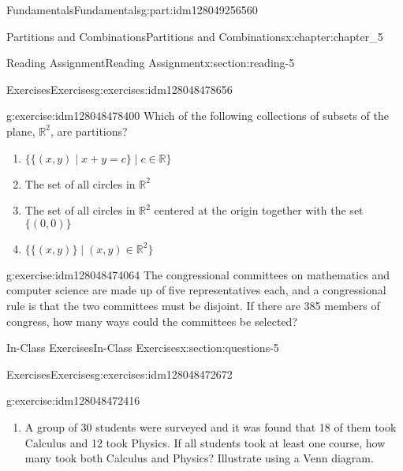 \documentclass[oneside,10pt,]{book}
\numberwithin{equation}{section}
\begin{document}
\begin{partptx}{Fundamentals}{}{Fundamentals}{}{}{g:part:idm128049256560}
\begin{chapterptx}{Partitions and Combinations}{}{Partitions and Combinations}{}{}{x:chapter:chapter_5}
\begin{sectionptx}{Reading Assignment}{}{Reading Assignment}{}{}{x:section:reading-5}
\begin{exercises-subsection}{Exercises}{}{Exercises}{}{}{g:exercises:idm128048478656}
%
\begin{exercisegroup}
\begin{divisionexerciseeg}{1}{}{}{g:exercise:idm128048478400}%
Which of the following collections of subsets of the plane, \(\mathbb{R}^2\), are partitions?%
\begin{enumerate}[label=(\alph*)]
\item{}\(\displaystyle \{ \{(x, y) \mid x + y = c \} \mid c \in \mathbb{R} \}\)%
\item{}The set of all circles in \(\mathbb{R}^2 \)%
\item{}The set of all circles in \(\mathbb{R}^2\) centered at the origin together with the set \(\{(0,0)\}\)%
\item{}\(\displaystyle \{\{(x, y)\} \mid (x, y) \in \mathbb{R}^2  \} \)%
\end{enumerate}
%
\end{divisionexerciseeg}%
\begin{divisionexerciseeg}{2}{}{}{g:exercise:idm128048474064}%
The congressional committees on mathematics and computer science are made up of five representatives each, and a congressional rule is that the two committees must be disjoint. If there are 385 members of congress, how many ways could the committees be selected?%
\end{divisionexerciseeg}%
\end{exercisegroup}
\par\medskip\noindent
\end{exercises-subsection}
\end{sectionptx}
%
%
\typeout{************************************************}
\typeout{************************************************}
%
\begin{sectionptx}{In-Class Exercises}{}{In-Class Exercises}{}{}{x:section:questions-5}
%
%
%
\typeout{************************************************}
\typeout{************************************************}
%
\begin{exercises-subsection}{Exercises}{}{Exercises}{}{}{g:exercises:idm128048472672}
\par\medskip\noindent%
%
\begin{exercisegroup}
\begin{divisionexerciseeg}{1}{}{}{g:exercise:idm128048472416}%
%
\begin{enumerate}[label=(\alph*)]
\item{}A group of 30 students were surveyed and it was found that 18 of them took Calculus and 12 took Physics. If all students took at least one course, how many took both Calculus and Physics? Illustrate using a Venn diagram.%

\end{enumerate}
\end{divisionexerciseeg}
\end{exercisegroup}
\end{exercises-subsection}
\end{sectionptx}
\end{chapterptx}
\end{partptx}
\end{document}
